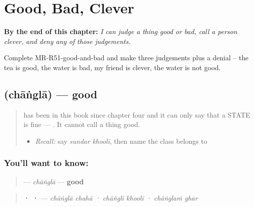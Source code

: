
\chapter{Good, Bad, Clever}
\label{ch:mr-good-and-bad}

\begin{chapteropening}
\textbf{By the end of this chapter:} \emph{I can judge a thing good or bad, call a person clever, and deny any of those judgements.}

Complete MR-R51-good-and-bad and make three judgements plus a denial -- the tea is good, the water is bad, my friend is clever, the water is not good.
\end{chapteropening}

\section[\texorpdfstring{\mr{चांगला} (chāṅglā)}{चांगला (chāṅglā)}]{ (chāṅglā) — good}

\label{lesson:MR-C51-changla}



\begin{quote}
\textbf{} has been in this book since chapter four and it can only say that a STATE is fine — \emph{  }. It cannot call a thing good.

\begin{itemize}
\raggedright
  \item \emph{Recall:} say \emph{sundar khoolī}, then name the class \textbf{} belongs to
\end{itemize}
\end{quote}

\subsection*{You'll want to know: }
\begin{quote}
\textbf{} — \emph{chāṅglā} — \textbf{good}
\end{quote}

\begin{quote}
\textbf{  ·   ·  } — \emph{chāṅglā chahā · chāṅglī khoolī · chāṅglaṁ ghar}
\end{quote}

